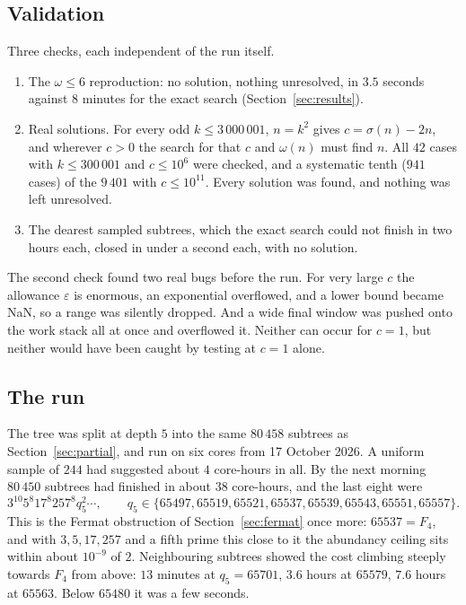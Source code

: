 \documentclass[11pt]{amsart}
\theoremstyle{remark}
\begin{document}
\subsection{Validation}
Three checks, each independent of the run itself.
\begin{enumerate}
\item The $\omega \le 6$ reproduction: no solution, nothing unresolved, in
  $3.5$ seconds against $8$ minutes for the exact search
  (Section~\ref{sec:results}).
\item Real solutions. For every odd $k \le 3\,000\,001$, $n = k^{2}$ gives
  $c = \sigma(n) - 2n$, and wherever $c > 0$ the search for that $c$ and
  $\omega(n)$ must find $n$. All $42$ cases with $k \le 300\,001$ and
  $c \le 10^{6}$ were checked, and a systematic tenth ($941$ cases) of the $9\,401$
  with $c \le 10^{11}$. Every solution was found, and nothing was left unresolved.
\item The dearest sampled subtrees, which the exact search could not finish in two
  hours each, closed in under a second each, with no solution.
\end{enumerate}
The second check found two real bugs before the run. For very large $c$ the
allowance $\varepsilon$ is enormous, an exponential overflowed, and a lower bound
became NaN, so a range was silently dropped. And a wide final window was pushed
onto the work stack all at once and overflowed it. Neither can occur for
$c = 1$, but neither would have been caught by testing at $c = 1$ alone.

\subsection{The run}
The tree was split at depth $5$ into the same $80\,458$ subtrees as
Section~\ref{sec:partial}, and run on six cores from 17 October 2026. A uniform
sample of $244$ had suggested about $4$ core-hours in all. By the next morning
$80\,450$ subtrees had finished in about $38$ core-hours, and the last eight were
\[
  3^{10} 5^{8} 17^{8} 257^{8} q_5^{2} \cdots, \qquad
  q_5 \in \{65497, 65519, 65521, 65537, 65539, 65543, 65551, 65557\}.
\]
This is the Fermat obstruction of Section~\ref{sec:fermat} once more:
$65537 = F_4$, and with $3, 5, 17, 257$ and a fifth prime this close to it the
abundancy ceiling sits within about $10^{-9}$ of $2$. Neighbouring subtrees
showed the cost climbing steeply towards $F_4$ from above: $13$ minutes at
$q_5 = 65701$, $3.6$ hours at $65579$, $7.6$ hours at $65563$. Below $65480$ it
was a few seconds.
\end{document}
